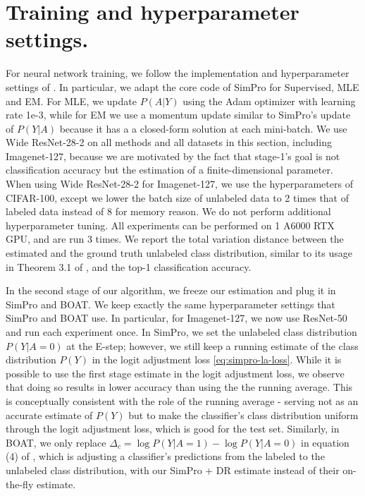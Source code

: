 \section{Training and hyperparameter settings.}
\label{subsec:training-setting}
For neural network training, we follow the implementation and hyperparameter settings of \cite{simpro}. In particular, we adapt the core code of SimPro for Supervised, MLE and EM. For MLE, we update $P(A|Y)$ using the Adam optimizer with learning rate 1e-3, while for EM we use a momentum update similar to SimPro's update of $P(Y|A)$ because it has a a closed-form solution at each mini-batch. We use Wide ResNet-28-2 on all methods and all datasets in this section, including Imagenet-127, because we are motivated by the fact that stage-1's goal is not classification accuracy but the estimation of a finite-dimensional parameter. When using Wide ResNet-28-2 for Imagenet-127, we use the hyperparameters of CIFAR-100, except we lower the batch size of unlabeled data to 2 times that of labeled data instead of 8 for memory reason. We do not perform additional hyperparameter tuning. All experiments can be performed on 1 A6000 RTX GPU, and are run 3 times. We report the total variation distance between the estimated and the ground truth unlabeled class distribution, similar to its usage in Theorem 3.1 of \cite{lsc}, and the top-1 classification accuracy.

In the second stage of our algorithm, we freeze our estimation and plug it in SimPro and BOAT.
We keep exactly the same hyperparameter settings that SimPro and BOAT use. In particular, for Imagenet-127, we now use ResNet-50 and run each experiment once.
In SimPro, we set the unlabeled class distribution $P(Y|A=0)$ at the E-step;  however, we still keep a running estimate of the class distribution $P(Y)$ in the logit adjustment loss \cref{eq:simpro-la-loss}. While it is possible to use the first stage estimate in the logit adjustment loss, we observe that doing so results in lower accuracy than using the the running average. This is conceptually consistent with the role of the running average - serving not as an accurate estimate of $P(Y)$ but to make the classifier's class distribution uniform through the logit adjustment loss, which is good for the test set. Similarly, in BOAT, we only replace $\Delta_c = \log P(Y|A=1) - \log P(Y|A=0)$ in equation (4) of \cite{boat}, which is adjusting a classifier's predictions from the labeled to the unlabeled class distribution, with our SimPro + DR estimate instead of their on-the-fly estimate. 


% 